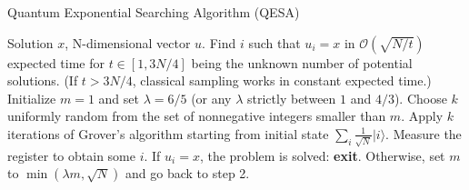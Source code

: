 \documentclass{article}
\begin{document}
\pagestyle{empty}

\begin{algorithm}[ht]
	\caption{Quantum Exponential Searching Algorithm (QESA)}
	\label{QESA}
	\begin{algorithmic}[1]

		\Require  Solution $x$, N-dimensional vector $u$.
		\Ensure Find $i$ such that $u_i = x$ in $\mathcal{O}(\sqrt{N/t})$ expected time for $t \in [1,3N/4]$ being the unknown number of potential solutions. (If $t>3N/4$, classical sampling works in constant expected time.)
		\vspace{10pt}
		\State Initialize $m=1$ and set $\lambda = 6/5$ (or any $\lambda$ strictly between $1$ and $4/3$).
		\State Choose $k$ uniformly random from the set of nonnegative integers smaller than $m$.
		\State Apply $k$ iterations of Grover's algorithm starting from initial state $\sum_i \frac{1}{\sqrt{N}} |i\rangle$.
		\State Measure the register to obtain some $i$.
		\State If $u_i = x$, the problem is solved: \textbf{exit}.
		\State Otherwise, set $m$ to $\min(\lambda m, \sqrt{N})$ and go back to step 2.
	\end{algorithmic}
\end{algorithm}
\end{document}
